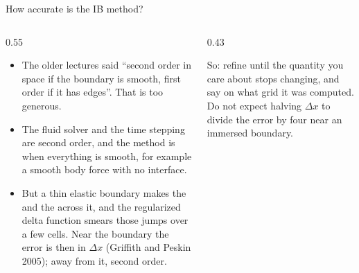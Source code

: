 \documentclass[aspectratio=169,11pt]{beamer}
\begin{document}
\begin{frame}{How accurate is the IB method?}
\begin{columns}[T,onlytextwidth]
\begin{column}{0.55\textwidth}
\begin{itemize}
  \item The older lectures said ``second order in space if the boundary is smooth, first order if it has edges''. That is too generous.
  \item The fluid solver and the time stepping are second order, and the method is  when everything is smooth, for example a smooth body force with no interface.
  \item But a thin elastic boundary makes the  and the  across it, and the regularized delta function smears those jumps over a few cells. Near the boundary the error is then  in $\Delta x$ (Griffith and Peskin 2005); away from it, second order.
\end{itemize}
\end{column}
\begin{column}{0.43\textwidth}
\begin{punchbox}
\small So: refine until the quantity you care about stops changing, and say on what grid it was computed. Do not expect halving $\Delta x$ to divide the error by four near an immersed boundary.
\end{punchbox}
\end{column}
\end{columns}
\end{frame}
\end{document}
